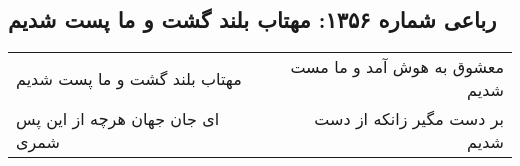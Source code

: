 \begin{center}
\section*{رباعی شماره ۱۳۵۶: مهتاب بلند گشت و ما پست شدیم}
\label{sec:1356}
\begin{longtable}{l p{0.5cm} r}
مهتاب بلند گشت و ما پست شدیم
&&
معشوق به هوش آمد و ما مست شدیم
\\
ای جان جهان هرچه از این پس شمری
&&
بر دست مگیر زانکه از دست شدیم
\\
\end{longtable}
\end{center}
